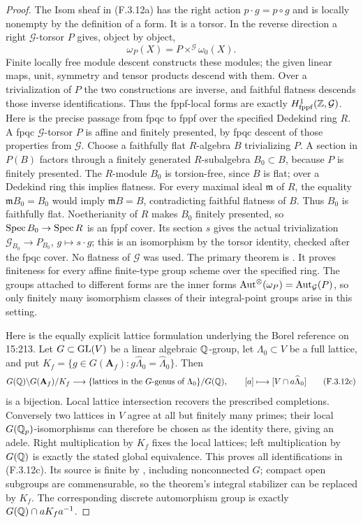 \begin{proof}
The Isom sheaf in (F.3.12a) has the right action
$p\cdot g=p\circ g$ and is locally nonempty by the definition
of a form. It is a torsor. In the reverse direction a right
$\mathcal G$-torsor $P$ gives, object by object,
\[
                  \omega_P(X)=P\times^{\mathcal G}\omega_0(X).
 \tag{F.3.12b}
\]
Finite locally free module descent constructs these modules;
the given linear maps, unit, symmetry and tensor products
descend with them. Over a trivialization of $P$ the two
constructions are inverse, and faithful flatness descends
those inverse identifications. Thus the fppf-local forms
are exactly $H^1_{\rm fppf}(\mathbb Z,\mathcal G)$.
Here is the precise passage from fpqc to fppf over the
specified Dedekind ring $R$. A fpqc $\mathcal G$-torsor $P$
is affine and finitely presented, by fpqc descent of those
properties from $\mathcal G$. Choose a faithfully flat
$R$-algebra $B$ trivializing $P$. A section in $P(B)$
factors through a finitely generated $R$-subalgebra
$B_0\subset B$, because $P$ is finitely presented.
The $R$-module $B_0$ is torsion-free, since $B$ is flat;
over a Dedekind ring this implies flatness. For every
maximal ideal $\mathfrak m$ of $R$, the equality
$\mathfrak m B_0=B_0$ would imply
$\mathfrak m B=B$, contradicting faithful flatness of $B$.
Thus $B_0$ is faithfully flat. Noetherianity of $R$ makes
$B_0$ finitely presented, so $\operatorname{Spec} B_0\to\operatorname{Spec} R$ is an
fppf cover. Its section $s$ gives the actual trivialization
$\mathcal G_{B_0}\to P_{B_0}$, $g\mapsto s\cdot g$;
this is an isomorphism by the torsor identity, checked after
the fpqc cover. No flatness of $\mathcal G$ was used.
The primary theorem is
\cite[Proposition 5.1, author preprint pp.8--10]{AuditGilleMoretBailly2013}.
It proves finiteness for every affine finite-type group
scheme over the specified ring. The groups attached to
different forms are the inner forms
$\operatorname{Aut}^\otimes(\omega_P)=\operatorname{Aut}_{\mathcal G}(P)$, so only
finitely many isomorphism classes of their integral-point
groups arise in this setting.

Here is the equally explicit lattice formulation underlying
the Borel reference on 15:213. Let $G\subset\operatorname{GL}(V)$ be a
linear algebraic $\mathbb Q$-group, let $\Lambda_0\subset V$ be a
full lattice, and put
$K_f=\{g\in G(\mathbf A_f):g\widehat\Lambda_0=\widehat\Lambda_0\}$.
Then
\[
 G(\mathbb Q)\backslash G(\mathbf A_f)/K_f
 \longrightarrow
 \{\text{lattices in the $G$-genus of $\Lambda_0$}\}/G(\mathbb Q),
 \qquad [a]\longmapsto[V\cap a\widehat\Lambda_0]
 \tag{F.3.12c}
\]
is a bijection. Local lattice intersection recovers the
prescribed completions. Conversely two lattices in $V$
agree at all but finitely many primes; their local
$G(\mathbb Q_p)$-isomorphisms can therefore be chosen as the identity
there, giving an adele. Right multiplication by $K_f$ fixes
the local lattices; left multiplication by $G(\mathbb Q)$ is exactly
the stated global equivalence. This proves all identifications
in (F.3.12c). Its source is finite by
\cite[\S2.1 and Theorem 5.1, p.19]{AuditBorel1963}, including
nonconnected $G$; compact open subgroups are commensurable,
so the theorem's integral stabilizer can be replaced by $K_f$.
The corresponding discrete automorphism group is exactly
$G(\mathbb Q)\cap aK_fa^{-1}$.


\end{proof}
